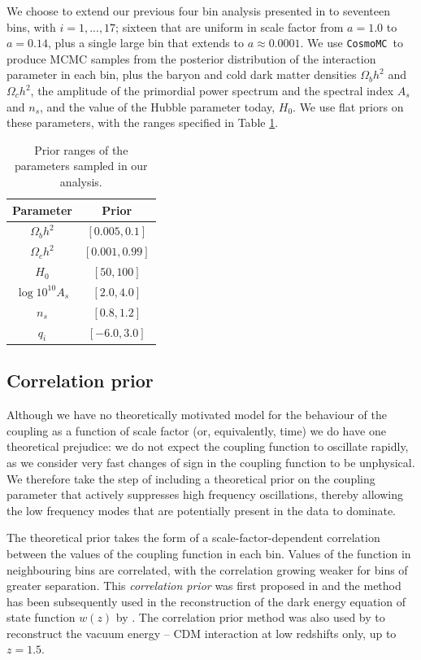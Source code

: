 \documentclass[final,3p,times,twocolumn]{elsarticle}
\newcommand{\CosmoMC}{\texttt{CosmoMC}}
\begin{document}
We choose to extend our previous four bin analysis presented in \cite{Martinelli:2019dau} to seventeen bins, with $i=1,...,17$; sixteen that are uniform in scale factor from $a=1.0$ to $a=0.14$, plus a single large bin that extends to $a\approx 0.0001$. We use \CosmoMC~to produce MCMC samples from the posterior distribution of the interaction parameter in each bin, plus the baryon and cold dark matter densities $\Omega_b h^2$ and $\Omega_c h^2$, the amplitude of the primordial power spectrum and the spectral index $A_s$ and  $n_s$, and the value of the Hubble parameter today, $H_0$. We use flat priors on these parameters, with the ranges specified in Table \ref{tab:priors}.

\begin{table}
\centering
\begin{tabular}{|c|c|}
\hline
Parameter          & Prior \\
\hline
$\Omega_bh^2$      &  $[0.005,0.1]$\\
$\Omega_ch^2$      &  $[0.001,0.99]$ \\
$H_0$              &  $[50,100]$\\
$\log{10^{10}A_s}$ &  $[2.0,4.0]$\\
$n_s$              &  $[0.8,1.2]$\\
$q_i$      &  $[-6.0,3.0]$  \\
\hline
\end{tabular}
\caption{Prior ranges of the parameters sampled in our analysis.}\label{tab:priors}
\end{table}

\subsection{Correlation prior}\label{subsec:cp}
Although we have no theoretically motivated model for the behaviour of the coupling as a function of scale factor (or, equivalently, time) we do have one theoretical prejudice: we do not expect the coupling function to oscillate rapidly, as we consider very fast changes of sign in the coupling function to be unphysical. We therefore take the step of including a theoretical prior on the coupling parameter that actively suppresses high frequency oscillations, thereby allowing the low frequency modes that are potentially present in the data to dominate.

The theoretical prior takes the form of a scale-factor-dependent correlation between the values of the coupling function in each bin. Values of the function in neighbouring bins are correlated, with the correlation growing weaker for bins of greater separation. This \textit{correlation prior} was first proposed in \cite{Crittenden:2005wj} and the method has been subsequently used in the reconstruction of the dark energy equation of state function $w(z)$ by \cite{Crittenden2012, Wang:2018fng,Gerardi:2019obr}. The correlation prior method was also used by \cite{Dam:2019prv} to reconstruct the vacuum energy -- CDM interaction at low redshifts only, up to $z=1.5$.
\end{document}
